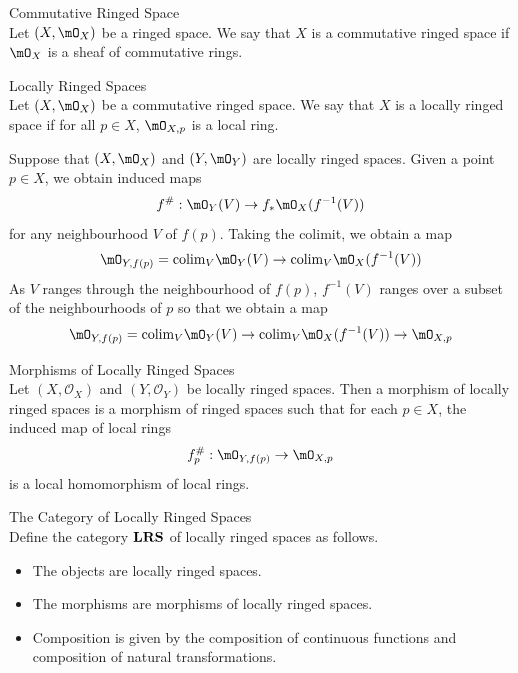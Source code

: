 \documentclass[a4paper]{article}
\begin{document}
\begin{defn}{Commutative Ringed Space}{}\\
Let $(X,\mO_X)$ be a ringed space. We say that $X$ is a commutative ringed space if $\mO_X$ is a sheaf of commutative rings. 
\end{defn}

\begin{defn}{Locally Ringed Spaces}{}\\
Let $(X,\mO_X)$ be a commutative ringed space. We say that $X$ is a locally ringed space if for all $p\in X$, $\mO_{X,p}$ is a local ring. 
\end{defn}

Suppose that $(X,\mO_X)$ and $(Y,\mO_Y)$ are locally ringed spaces. Given a point $p\in X$, we obtain induced maps $$f^\#:\mO_Y(V)\to f_\ast\mO_X(f^{-1}(V))$$ for any neighbourhood $V$ of $f(p)$. Taking the colimit, we obtain a map $$\mO_{Y,f(p)}=\text{colim}_V\mO_Y(V)\to\text{colim}_V\mO_X(f^{-1}(V))$$ As $V$ ranges through the neighbourhood of $f(p)$, $f^{-1}(V)$ ranges over a subset of the neighbourhoods of $p$ so that we obtain a map $$\mO_{Y,f(p)}=\text{colim}_V\mO_Y(V)\to\text{colim}_V\mO_X(f^{-1}(V))\to\mO_{X,p}$$

\begin{defn}{Morphisms of Locally Ringed Spaces}{}\\
Let $(X,\mathcal{O}_X)$ and $(Y,\mathcal{O}_Y)$ be locally ringed spaces. Then a morphism of locally ringed spaces is a morphism of ringed spaces such that for each $p\in X$, the induced map of local rings $$f_p^\#:\mO_{Y,f(p)}\to\mO_{X,p}$$ is a local homomorphism of local rings. 
\end{defn}

\begin{defn}{The Category of Locally Ringed Spaces}{}\\
Define the category $\bold{LRS}$ of locally ringed spaces as follows. 
\begin{itemize}
\item The objects are locally ringed spaces. 
\item The morphisms are morphisms of locally ringed spaces. \
\item Composition is given by the composition of continuous functions and composition of natural transformations. 
\end{itemize}
\end{defn}
\end{document}
